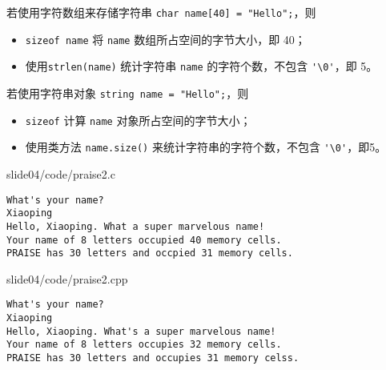 \begin{frame}[fragile]

  \begin{free}[C字符串]{}
    若使用字符数组来存储字符串 \lstinline|char name[40] = "Hello";|，则
    \begin{itemize}
    \item \lstinline|sizeof name| 将 \lstinline|name| 数组所占空间的字节大小，即 40；
    \item 使用\lstinline|strlen(name)| 统计字符串 \lstinline|name| 的字符个数，不包含 \lstinline|'\0'|，即 5。
    \end{itemize}  
  \end{free}


  \begin{free}[C++字符串]{}
    若使用字符串对象 \lstinline|string name = "Hello";|，则
    \begin{itemize}
    \item \lstinline|sizeof| 计算 \lstinline|name| 对象所占空间的字节大小；\\[0.1in]
    \item 使用类方法 \lstinline|name.size()| 来统计字符串的字符个数，不包含 \lstinline|'\0'|，即5。
    \end{itemize}  
  \end{free}
\end{frame}

\begin{frame}

{
  slide04/code/praise2.c
}
\end{frame}

\begin{frame}[fragile]\ft{\secname}

\begin{lstlisting}[backgroundcolor=\color{red!20}]
What's your name?
Xiaoping
Hello, Xiaoping. What a super marvelous name!
Your name of 8 letters occupied 40 memory cells.
PRAISE has 30 letters and occpied 31 memory cells.
\end{lstlisting}
\end{frame}


\begin{frame}[allowframebreaks]

{
  slide04/code/praise2.cpp
}
\end{frame}

\begin{frame}[fragile]

\begin{lstlisting}[backgroundcolor=\color{red!20}]
What's your name?
Xiaoping
Hello, Xiaoping. What's a super marvelous name!
Your name of 8 letters occupies 32 memory cells.
PRAISE has 30 letters and occupies 31 memory celss.
\end{lstlisting}
\end{frame}


